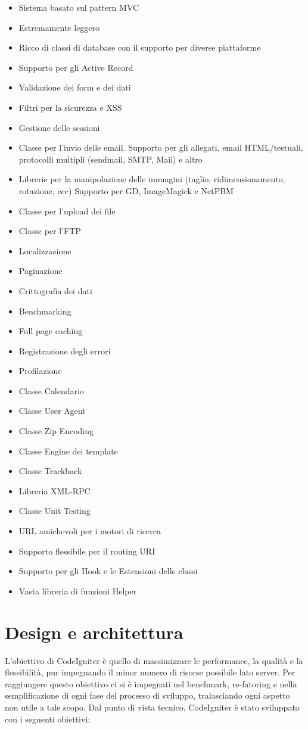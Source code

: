 \begin{itemize}
\item Sistema basato sul pattern \ac{MVC}
\item Estremamente leggero
\item Ricco di classi di database con il supporto per diverse piattaforme
\item Supporto per gli Active Record
\item Validazione dei form e dei dati
\item Filtri per la sicurezza e \ac{XSS}
\item Gestione delle sessioni
\item Classe per l'invio delle email. Supporto per gli allegati, email \ac{HTML}/testuali, protocolli multipli (sendmail, \ac{SMTP}, Mail) e altro
\item Librerie per la manipolazione delle immagini (taglio, ridimensionamento, rotazione, ecc) Supporto per \ac{GD}, ImageMagick e NetPBM
\item Classe per l'upload dei file
\item Classe per l'\ac{FTP}
\item Localizzazione
\item Paginazione
\item Crittografia dei dati
\item Benchmarking
\item Full page caching
\item Registrazione degli errori
\item Profilazione
\item Classe Calendario
\item Classe User Agent
\item Classe Zip Encoding
\item Classe Engine dei template
\item Classe Trackback
\item Libreria \ac{XML-RPC}
\item Classe Unit Testing
\item \ac{URL} amichevoli per i motori di ricerca
\item Supporto flessibile per il routing \ac{URI}
\item Supporto per gli Hook e le Estensioni delle classi
\item Vasta libreria di funzioni Helper
\end{itemize}

\section{Design e architettura}
L'obiettivo di CodeIgniter è quello di massimizzare le performance, la qualità e la flessibilità, pur impegnando il minor numero di risorse possibile lato server. Per raggiungere questo obiettivo ci si è impegnati nel benchmark, re-fatoring e nella semplificazione di ogni fase del processo di sviluppo, tralasciando ogni aspetto non utile a tale scopo. Dal punto di vista tecnico, CodeIgniter è stato sviluppato con i seguenti obiettivi:


